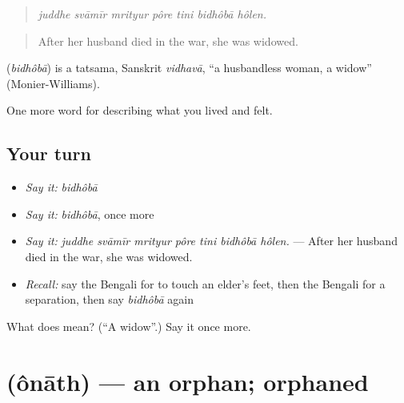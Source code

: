 \begin{quote}
      
\end{quote}

\begin{quote}
\emph{juddhe svāmīr mrityur pôre tini bidhôbā hôlen.}
\end{quote}

\begin{quote}
After her husband died in the war, she was widowed.
\end{quote}

\begin{cousinweb}
\textbf{} (\emph{bidhôbā}) is a tatsama, Sanskrit \emph{vidhavā}, \textquotedblleft{}a husbandless woman, a widow\textquotedblright{} (Monier-Williams).
\end{cousinweb}

\begin{grammarlens}[title={What you've built}]
One more word for describing what you lived and felt.
\end{grammarlens}

\subsection*{Your turn}
\begin{itemize}
\raggedright
  \item \emph{Say it:} \emph{bidhôbā}
  \item \emph{Say it:} \emph{bidhôbā}, once more
  \item \emph{Say it:} \emph{juddhe svāmīr mrityur pôre tini bidhôbā hôlen.} — After her husband died in the war, she was widowed.
  \item \emph{Recall:} say the Bengali for to touch an elder's feet, then the Bengali for a separation, then say \emph{bidhôbā} again
\end{itemize}

\begin{tcolorbox}[breakable,colback=teal!4,colframe=teal!35!black,title={Before you move on}]
What does  mean? (\textquotedblleft{}A widow\textquotedblright{}.) Say it once more.
\end{tcolorbox}
\section[\texorpdfstring{\bn{অনাথ} (ônāth)}{অনাথ (ônāth)}]{ (ônāth) — an orphan; orphaned}

